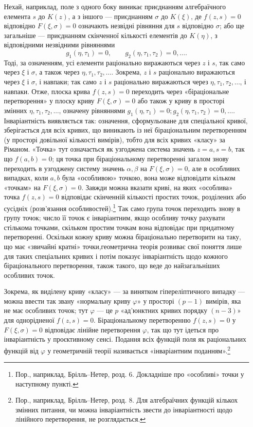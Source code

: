 \documentclass[11pt]{article}
\begin{document}
Нехай, наприклад, поле з одного боку виникає приєднанням алгебраїчного елемента \(s\) до \(K(z)\), а з іншого --- приєднанням \(\sigma\) до \(K(\xi)\), де \(f(z,s)=0\) відповідно \(F(\xi,\sigma)=0\) означають незвідні рівняння для \(s\) відповідно \(\sigma\); або ще загальніше --- приєднанням скінченної кількості елементів до \(K(\eta)\), з відповідними незвідними рівняннями
\[
g_1(\eta,\tau_1)=0,\qquad g_2(\eta,\tau_1,\tau_2)=0,\ldots .
\]
Тоді, за означенням, усі елементи раціонально виражаються через \(z\) і \(s\), так само через \(\xi\) і \(\sigma\), а також через \(\eta,\tau_1,\tau_2,\ldots\). Зокрема, \(z\) і \(s\) раціонально виражаються через \(\xi\) і \(\sigma\), і навпаки; так само \(z\) і \(s\) раціонально виражаються через \(\eta,\tau_1,\tau_2,\ldots\), і навпаки. Отже, плоска крива \(f(z,s)=0\) переходить через «біраціональне перетворення» у плоску криву \(F(\xi,\sigma)=0\) або також у криву в просторі змінних \(\eta,\tau_1,\tau_2,\ldots\), означену рівняннями \(g_1(\eta,\tau_1)=0; g_2(\eta,\tau_1,\tau_2)=0,\ldots\). Інваріантність виявляється так: означення, сформульоване для спеціальної кривої, зберігається для всіх кривих, що виникають із неї біраціональним перетворенням (у просторі довільної кількості вимірів), тобто для всіх кривих «класу» за Ріманом. «Точка» тут означається як узгоджена система значень \(z=a,s=b\), так що \(f(a,b)=0\); ця точка при біраціональному перетворенні загалом знову переходить в узгоджену систему значень \(\alpha,\beta\) на \(F(\xi,\sigma)=0\), але в особливих випадках, коли \(a,b\) була «особливою» точкою, вона може відповідати кільком «точкам» на \(F(\xi,\sigma)=0\). Завжди можна вказати криві, на яких «особлива» точка \(f(z,s)=0\) відповідає скінченній кількості простих точок, розділених або сусідніх (розв'язання особливостей).\footnote{Пор., наприклад, Брілль--Нетер, розд. 6. Докладніше про «особливі» точки у наступному пункті.} Так само група точок переходить знову в групу точок; число її точок є інваріантним, якщо особливу точку рахувати стількома точками, скільком простим точкам вона відповідає при придатному перетворенні. Оскільки кожну криву можна біраціонально перетворити на таку, що має «звичайні кратні» точки,\footnotemark[\value{footnote}] геометрична теорія розвиває свої поняття лише для таких спеціальних кривих і потім показує інваріантність щодо кожного біраціонального перетворення, також такого, що веде до найзагальніших особливих точок.

Зокрема, як виділену криву «класу» --- за винятком гіпереліптичного випадку --- можна ввести так звану «нормальну криву \(\varphi\)» у просторі \((p-1)\) вимірів, яка не має особливих точок; тут \(\varphi\) --- це \(p\) «ад'юнктних кривих порядку \((n-3)\)» для однорідненої \(f(z,s)=0\). Біраціональному перетворенню \(f(z,s)=0\) у \(F(\xi,\sigma)=0\) відповідає лінійне перетворення \(\varphi\), так що тут ідеться про інваріантність у проєктивному сенсі. Подання всіх функцій поля як раціональних функцій від \(\varphi\) у геометричній теорії називається «інваріантним поданням».\footnote{Пор., наприклад, Брілль--Нетер, розд. 8. Для алгебраїчних функцій кількох змінних питання, чи можна інваріантність звести до інваріантності щодо лінійного перетворення, не розглядається.}
\end{document}
